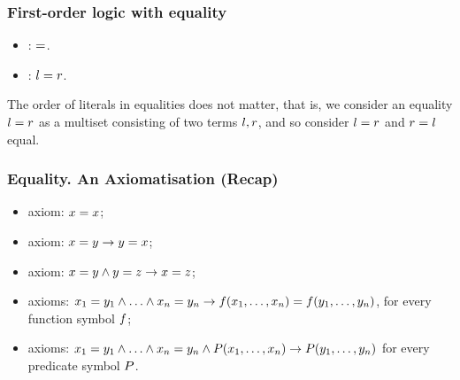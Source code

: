 \renewcommand{\eql}{=}


                       \begin{frame}\frametitle{First-order logic with equality}

\begin{itemize}
  \item {}: $\M{\eql}$.
  \item {}: $\M{l \eql r}$.
\end{itemize}
The order of literals in equalities does not matter, that is, we
consider an equality $\M{l\eql r}$ as a multiset consisting of
two terms ${l,r}$, and so consider $\M{l\eql r}$ and $\M{r\eql l}$
equal.

                                \end{frame}



                  \begin{frame}\frametitle{Equality. An Axiomatisation
                    (Recap)}


\begin{itemize}
\item {} axiom: $\M{x \eql x}$;

\item {} axiom: $\M{x \eql y \imply y \eql x}$;

\item {} axiom: $\M{x \eql y \andl y
  \eql z \imply x \eql z}$;

\item {} axioms:
  $\M{x_1 \eql y_1 \andl \ldots \andl x_n \eql y_n \imply f(\xone{x}{n}) \eql
  f(\xone{y}{n})}$, for every function symbol ${f}$;

\item {} axioms:
  $\M{x_1 \eql y_1 \andl \ldots \andl x_n \eql y_n \andl P(\xone{x}{n}) \imply
  P(\xone{y}{n})}$ for every predicate symbol ${P}$.
\end{itemize}

                                \end{frame}




